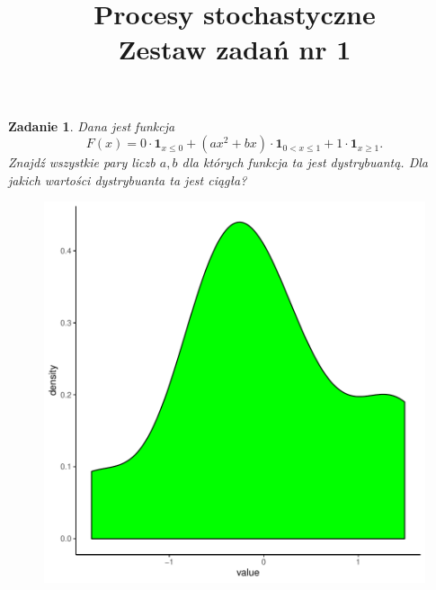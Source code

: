 \documentclass{mwart}
\title{Procesy stochastyczne\\ Zestaw zadań nr 1}
\newtheorem{zd}{Zadanie}
\begin{document}

\maketitle

\begin{zd}
Dana jest funkcja
\begin{displaymath}
F(x) = 0\cdot\pmb{1}_{x\leq 0} + (ax^2+bx)\cdot\pmb{1}_{0<x\leq 1} + 1\cdot \pmb{1}_{x\geq 1}.
\end{displaymath}
Znajdź wszystkie pary liczb $a, b$ dla których funkcja ta jest dystrybuantą. Dla jakich wartości dystrybuanta ta jest ciągła?
\end{zd}





\begin{figure}
\includegraphics{Zestaw1_PS_2020-003}
\end{figure}
\end{document}
